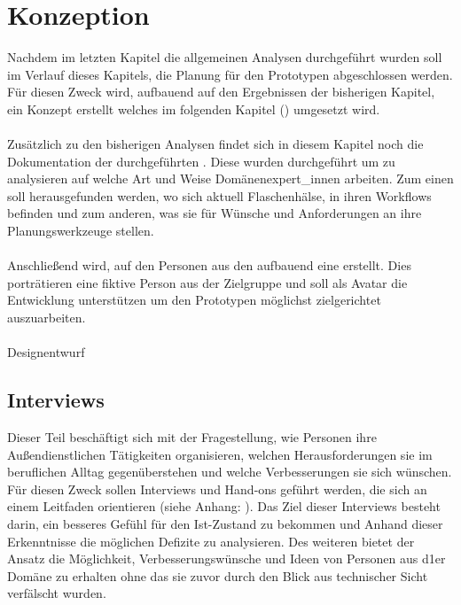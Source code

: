 \documentclass[Bachelorarbeit.tex]{subfiles}
\begin{document}
\chapter{Konzeption}
\label{chap:entwicklung}
Nachdem im letzten Kapitel die allgemeinen Analysen durchgeführt wurden soll im Verlauf dieses Kapitels, die Planung für den Prototypen abgeschlossen werden.
Für diesen Zweck wird, aufbauend auf den Ergebnissen der bisherigen Kapitel, ein Konzept erstellt welches im folgenden Kapitel () umgesetzt wird. \\
\\
Zusätzlich zu den bisherigen Analysen findet sich in diesem Kapitel noch die Dokumentation der durchgeführten .
Diese  wurden durchgeführt um zu analysieren auf welche Art und Weise  Domänenexpert\_innen arbeiten.
Zum einen soll herausgefunden werden, wo sich aktuell Flaschenhälse, in ihren Workflows befinden und zum anderen, was sie für Wünsche und Anforderungen an ihre Planungswerkzeuge stellen.\\
\\
Anschließend wird, auf den Personen aus den  aufbauend eine  erstellt.
Dies porträtieren eine fiktive Person aus der Zielgruppe und soll als Avatar die Entwicklung unterstützen um den Prototypen möglichst zielgerichtet auszuarbeiten.
\\
\\
Designentwurf

\section{Interviews}
\label{chap:analyse:sec:interviews}
Dieser Teil beschäftigt sich mit der Fragestellung, wie Personen ihre Außendienstlichen Tätigkeiten organisieren, welchen Herausforderungen sie im beruflichen Alltag gegenüberstehen und welche Verbesserungen sie sich wünschen. 
Für diesen Zweck sollen Interviews und Hand-ons  geführt werden, die sich an einem Leitfaden orientieren (siehe Anhang: ). 
Das Ziel dieser Interviews besteht darin, ein besseres Gefühl für den Ist-Zustand zu bekommen und Anhand dieser Erkenntnisse die möglichen Defizite zu analysieren.
Des weiteren bietet der Ansatz die Möglichkeit, Verbesserungswünsche und Ideen von Personen aus d1er Domäne zu erhalten ohne das sie zuvor durch den Blick aus technischer Sicht verfälscht wurden.
\end{document}
